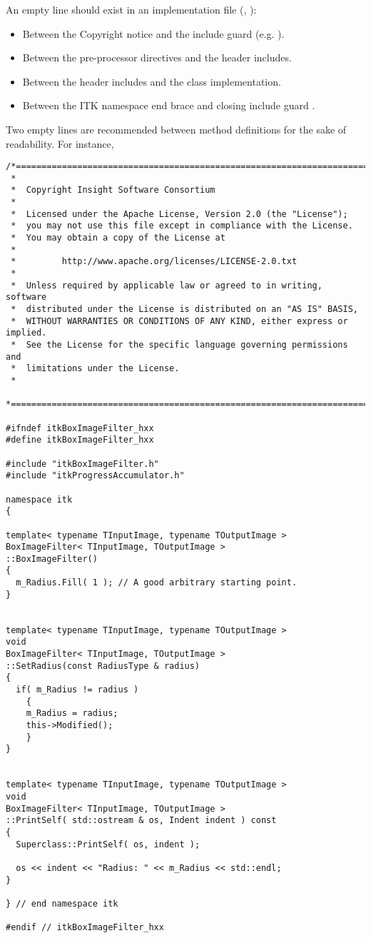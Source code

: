 An empty line should exist in an implementation file (, ):
\begin{itemize}
\item Between the Copyright notice and the include guard (e.g.
).
\item Between the pre-processor directives and the header includes.
\item Between the header includes and the class implementation.
\item Between the ITK namespace end brace  and
closing include guard .
\end{itemize}

Two empty lines are recommended between method definitions for the sake of
readability.
For instance,

\small
\begin{verbatim}
/*=========================================================================
 *
 *  Copyright Insight Software Consortium
 *
 *  Licensed under the Apache License, Version 2.0 (the "License");
 *  you may not use this file except in compliance with the License.
 *  You may obtain a copy of the License at
 *
 *         http://www.apache.org/licenses/LICENSE-2.0.txt
 *
 *  Unless required by applicable law or agreed to in writing, software
 *  distributed under the License is distributed on an "AS IS" BASIS,
 *  WITHOUT WARRANTIES OR CONDITIONS OF ANY KIND, either express or implied.
 *  See the License for the specific language governing permissions and
 *  limitations under the License.
 *
 *=========================================================================*/

#ifndef itkBoxImageFilter_hxx
#define itkBoxImageFilter_hxx

#include "itkBoxImageFilter.h"
#include "itkProgressAccumulator.h"

namespace itk
{

template< typename TInputImage, typename TOutputImage >
BoxImageFilter< TInputImage, TOutputImage >
::BoxImageFilter()
{
  m_Radius.Fill( 1 ); // A good arbitrary starting point.
}


template< typename TInputImage, typename TOutputImage >
void
BoxImageFilter< TInputImage, TOutputImage >
::SetRadius(const RadiusType & radius)
{
  if( m_Radius != radius )
    {
    m_Radius = radius;
    this->Modified();
    }
}


template< typename TInputImage, typename TOutputImage >
void
BoxImageFilter< TInputImage, TOutputImage >
::PrintSelf( std::ostream & os, Indent indent ) const
{
  Superclass::PrintSelf( os, indent );

  os << indent << "Radius: " << m_Radius << std::endl;
}

} // end namespace itk

#endif // itkBoxImageFilter_hxx
\end{verbatim}
\normalsize

